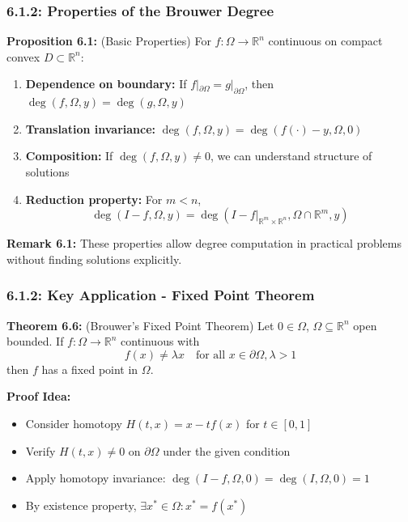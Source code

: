 \documentclass[aspectratio=169,10pt]{beamer}
\begin{document}
\begin{frame}
\frametitle{6.1.2: Properties of the Brouwer Degree}

\textbf{Proposition 6.1:} (Basic Properties) For $f: \Omega \to \mathbb{R}^n$ continuous on compact convex $D \subset \mathbb{R}^n$:
\begin{enumerate}
    \item \textbf{Dependence on boundary:} If $f|_{\partial\Omega} = g|_{\partial\Omega}$, then $\deg(f, \Omega, y) = \deg(g, \Omega, y)$
    \vspace{0.2cm}
    \item \textbf{Translation invariance:} $\deg(f, \Omega, y) = \deg(f(\cdot) - y, \Omega, 0)$
    \vspace{0.2cm}
    \item \textbf{Composition:} If $\deg(f, \Omega, y) \neq 0$, we can understand structure of solutions
    \vspace{0.2cm}
    \item \textbf{Reduction property:} For $m < n$,
    $$\deg(I - f, \Omega, y) = \deg(I - f|_{\mathbb{R}^m \times \mathbb{R}^n}, \Omega \cap \mathbb{R}^m, y)$$
\end{enumerate}

\vspace{0.3cm}
\textbf{Remark 6.1:} These properties allow degree computation in practical problems without finding solutions explicitly.
\end{frame}

\begin{frame}
\frametitle{6.1.2: Key Application - Fixed Point Theorem}

\textbf{Theorem 6.6:} (Brouwer's Fixed Point Theorem) Let $0 \in \Omega$, $\Omega \subseteq \mathbb{R}^n$ open bounded. If $f: \Omega \to \mathbb{R}^n$ continuous with
$$f(x) \neq \lambda x \quad \text{for all } x \in \partial\Omega, \lambda > 1$$
then $f$ has a fixed point in $\Omega$.

\vspace{0.4cm}
\textbf{Proof Idea:}
\begin{itemize}
    \item Consider homotopy $H(t,x) = x - tf(x)$ for $t \in [0,1]$
    \item Verify $H(t,x) \neq 0$ on $\partial\Omega$ under the given condition
    \item Apply homotopy invariance: $\deg(I - f, \Omega, 0) = \deg(I, \Omega, 0) = 1$
    \item By existence property, $\exists x^* \in \Omega: x^* = f(x^*)$
\end{itemize}
\end{frame}
\end{document}
